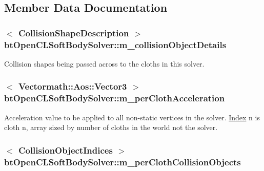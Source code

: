 \subsection{Member Data Documentation}
\hypertarget{classbt_open_c_l_soft_body_solver_a686543041f61bec0aba0e0e03db363fe}{
\subsubsection[{m\+\_\+collision\+Object\+Details}]{$<$ {\bf Collision\+Shape\+Description} $>$ bt\+Open\+C\+L\+Soft\+Body\+Solver\+::m\+\_\+collision\+Object\+Details\hspace{0.3cm}{\ttfamily [protected]}}}\label{classbt_open_c_l_soft_body_solver_a686543041f61bec0aba0e0e03db363fe}
Collision shapes being passed across to the cloths in this solver. \hypertarget{classbt_open_c_l_soft_body_solver_ac958100c16c9c92b08cf2f6066697990}{
\subsubsection[{m\+\_\+per\+Cloth\+Acceleration}]{$<$ {\bf Vectormath\+::\+Aos\+::\+Vector3} $>$ bt\+Open\+C\+L\+Soft\+Body\+Solver\+::m\+\_\+per\+Cloth\+Acceleration\hspace{0.3cm}{\ttfamily [protected]}}}\label{classbt_open_c_l_soft_body_solver_ac958100c16c9c92b08cf2f6066697990}
Acceleration value to be applied to all non-\/static vertices in the solver. \hyperlink{struct_index}{Index} n is cloth n, array sized by number of cloths in the world not the solver. \hypertarget{classbt_open_c_l_soft_body_solver_a01356688ec3d99fe305ee2e70cf884d1}{
\subsubsection[{m\+\_\+per\+Cloth\+Collision\+Objects}]{$<$ {\bf Collision\+Object\+Indices} $>$ bt\+Open\+C\+L\+Soft\+Body\+Solver\+::m\+\_\+per\+Cloth\+Collision\+Objects\hspace{0.3cm}{\ttfamily [protected]}}}\label{classbt_open_c_l_soft_body_solver_a01356688ec3d99fe305ee2e70cf884d1}
